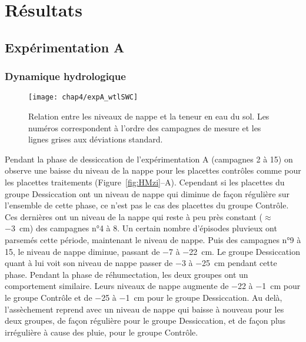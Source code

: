 \section{Résultats}

\subsection{Expérimentation A}

\subsubsection{Dynamique hydrologique}

\begin{figure}
\centering
\texttt{[image: chap4/expA\_wtlSWC]}
\caption{Relation entre les niveaux de nappe et la teneur en eau du sol. Les numéros correspondent à l'ordre des campagnes de mesure et les lignes grises aux déviations standard.}
\label{fig:wtlSWC_A}
\end{figure}

Pendant la phase de dessiccation de l'expérimentation A (campagnes 2 à 15) on observe une baisse du niveau de la nappe pour les placettes contrôles comme pour les placettes traitements (Figure~\ref{fig:HMzi}--A).
Cependant si les placettes du groupe Dessiccation ont un niveau de nappe qui diminue de façon régulière sur l'ensemble de cette phase, ce n'est pas le cas des placettes du groupe Contrôle.
Ces dernières ont un niveau de la nappe qui reste à peu près constant ($\approx$ \SI{-3}{\centi\metre}) des campagnes n°4 à 8.
Un certain nombre d'épisodes pluvieux ont parsemés cette période, maintenant le niveau de nappe.
Puis des campagnes n°9 à 15, le niveau de nappe diminue, passant de \num{-7} à \SI{-22}{\centi\metre}.
Le groupe Dessiccation quant à lui voit son niveau de nappe passer de \num{-3}  à \SI{-25}{\centi\metre} pendant cette phase.
Pendant la phase de réhumectation, les deux groupes ont un comportement similaire.
Leurs niveaux de nappe augmente de \num{-22} à \SI{-1}{\centi\metre} pour le groupe Contrôle et de \num{-25} à \SI{-1}{\centi\metre} pour le groupe Dessiccation.
Au delà, l'assèchement reprend avec un niveau de nappe qui baisse à nouveau pour les deux groupes, de façon régulière pour le groupe Dessiccation, et de façon plus irrégulière à cause des pluie, pour le groupe Contrôle.


